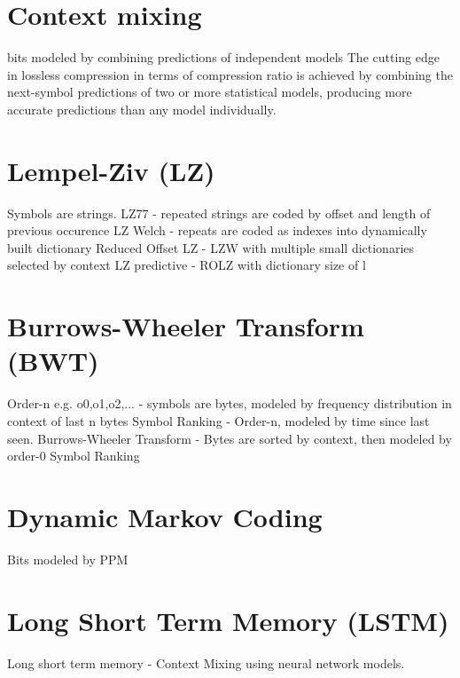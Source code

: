 \documentclass[a4paper, 11pt]{article}
\numberwithin{equation}{section}
\theoremstyle{plain}
\theoremstyle{definition}
\begin{document}
\section{Context mixing}
bits modeled by combining predictions of independent models
The cutting edge in lossless compression in terms of compression ratio is achieved by combining 
the next-symbol predictions of two or more statistical models, producing more accurate predictions 
than any model individually.

\section{Lempel-Ziv (LZ)}
Symbols are strings.
LZ77 - repeated strings are coded by offset and length of previous occurence
LZ Welch - repeats are coded as indexes into dynamically built dictionary
Reduced Offset LZ - LZW with multiple small dictionaries selected by context
LZ predictive - ROLZ with dictionary size of l

\section{Burrows-Wheeler Transform (BWT)}
Order-n e.g. o0,o1,o2,... - symbols are bytes, modeled by frequency distribution in context of last n bytes
Symbol Ranking - Order-n, modeled by time since last seen.
Burrows-Wheeler Transform - Bytes are sorted by context, then modeled by order-0 Symbol Ranking

\section{Dynamic Markov Coding}
Bits modeled by PPM

\section{Long Short Term Memory (LSTM)}
Long short term memory - Context Mixing using neural network models.

\cite{TextBenchmark}



\end{document}
